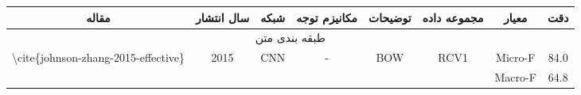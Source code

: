 \begin{table}[]
    \begin{tabular}{|c|c|c|c|c|c|cc|}
    \hline
    مقاله                                                                                 & سال انتشار                                 & شبکه                                              & مکانیزم توجه                                              & توضیحات                                                                                                                & مجموعه داده                                           & \multicolumn{1}{c|}{معیار}                                                                                                         & دقت                        \\ \hline
    \multicolumn{8}{|c|}{طبقه بندی متن}                                                                                                                                                                                                                                                                                                                                                                                                                                                                                                                                                                   \\ \hline
    \multirow{2}{*}{\textbackslash{}cite\{johnson-zhang-2015-effective\}}                 & \multirow{2}{*}{2015}                      & \multirow{2}{*}{CNN}                              & \multirow{2}{*}{-}                                        & \multirow{2}{*}{BOW}                                                                                                   & \multirow{2}{*}{RCV1}                                 & \multicolumn{1}{c|}{Micro-F}                                                                                                       & 84.0                       \\ \cline{7-8} 
                                                                                          &                                            &                                                   &                                                           &                                                                                                                        &                                                       & \multicolumn{1}{c|}{Macro-F}                                                                                                       & 64.8                       \\ \hline

\end{tabular}
\end{table}
